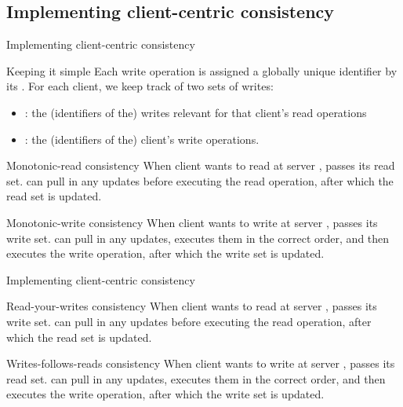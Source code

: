 \subsection{Implementing client-centric consistency}
\begin{slide}{Implementing client-centric consistency}
  
  \begin{block}{Keeping it simple}
    Each write operation  is assigned a globally unique identifier by its . For each
    client, we keep track of two sets of writes:
    \begin{itemize}
    \item {}: the (identifiers of the) writes relevant for that client's read operations
    \item {}: the (identifiers of the) client's write operations.
    \end{itemize}
  \end{block}

  \onslide
  \begin{block}{Monotonic-read consistency}
    When client  wants to read at server ,  passes its read set.  can pull in any
    updates before executing the read operation, after which the read set is updated.
  \end{block}

  \onslide
  \begin{block}{Monotonic-write consistency}
    When client  wants to write at server ,  passes its write set.  can pull in any
    updates, executes them in the correct order, and then executes the write operation, after which the write
    set is updated.
  \end{block}

\end{slide}
\begin{slide}{Implementing client-centric consistency}
  
  \begin{block}{Read-your-writes consistency}
    When client  wants to read at server ,  passes its write set.  can pull in any
    updates before executing the read operation, after which the read set is updated.
  \end{block}

  \onslide
  \begin{block}{Writes-follows-reads consistency}
    When client  wants to write at server ,  passes its read set.  can pull in any
    updates, executes them in the correct order, and then executes the write operation, after which the write
    set is updated.
  \end{block}

\end{slide}
